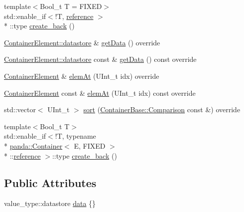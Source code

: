 \begin{DoxyCompactItemize}
\item 
{\footnotesize template$<$Bool\-\_\-t T = F\-I\-X\-E\-D$>$ }\\std\-::enable\-\_\-if$<$!T, \hyperlink{classpanda_1_1Container_a3b6330ccf0d9ed33975d098520f103cb}{reference} $>$\\*
\-::type \hyperlink{classpanda_1_1Container_a0cf57ab6fd9bf1980e4386b99bb78e6d}{create\-\_\-back} ()
\item 
\hyperlink{structpanda_1_1ContainerElement_1_1datastore}{Container\-Element\-::datastore} \& \hyperlink{classpanda_1_1Container_ae8c189c8e337af593b268455a2dda89f}{get\-Data} () override
\item 
\hyperlink{structpanda_1_1ContainerElement_1_1datastore}{Container\-Element\-::datastore} const \& \hyperlink{classpanda_1_1Container_a791cc117ae038a705cf273a0809e620e}{get\-Data} () const override
\item 
\hyperlink{classpanda_1_1ContainerElement}{Container\-Element} \& \hyperlink{classpanda_1_1Container_a68b47c93f31dd6c4de03f1e78a55c143}{elem\-At} (U\-Int\-\_\-t idx) override
\item 
\hyperlink{classpanda_1_1ContainerElement}{Container\-Element} const \& \hyperlink{classpanda_1_1Container_acbe367b43d390f275fed07617304c0fc}{elem\-At} (U\-Int\-\_\-t idx) const override
\item 
std\-::vector$<$ U\-Int\-\_\-t $>$ \hyperlink{classpanda_1_1Container_ab583fc6e84b476b1dcba825547edcc6d}{sort} (\hyperlink{classpanda_1_1ContainerBase_a40186ae7417ad01d9a186b3f49eab212}{Container\-Base\-::\-Comparison} const \&) override
\item 
{\footnotesize template$<$Bool\-\_\-t T$>$ }\\std\-::enable\-\_\-if$<$!T, typename \\*
\hyperlink{classpanda_1_1Container}{panda\-::\-Container}$<$ E, F\-I\-X\-E\-D $>$\\*
\-::\hyperlink{classpanda_1_1Container_a3b6330ccf0d9ed33975d098520f103cb}{reference} $>$\-::type \hyperlink{classpanda_1_1Container_a9603d59e46e21b048714a9760964b536}{create\-\_\-back} ()
\end{DoxyCompactItemize}
\subsection*{Public Attributes}
\begin{DoxyCompactItemize}
\item 
value\-\_\-type\-::datastore \hyperlink{classpanda_1_1Container_acda9cf902ea418e49a3b6dc38c235c56}{data} \{\}
\end{DoxyCompactItemize}
